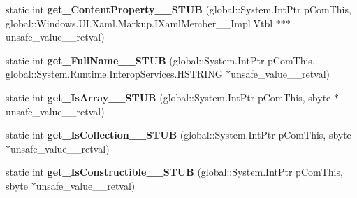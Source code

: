 \begin{DoxyCompactItemize}
\item 
\mbox{\label{struct_windows_1_1_u_i_1_1_xaml_1_1_markup_1_1_i_xaml_type_____impl_1_1_vtbl_ada750449c85f0ee2addc461396c3694e}} 
static int {\bfseries get\+\_\+\+Content\+Property\+\_\+\+\_\+\+S\+T\+UB} (global\+::\+System.\+Int\+Ptr p\+Com\+This, global\+::\+Windows.\+U\+I.\+Xaml.\+Markup.\+I\+Xaml\+Member\+\_\+\+\_\+\+Impl.\+Vtbl $\ast$$\ast$$\ast$unsafe\+\_\+value\+\_\+\+\_\+retval)
\item 
\mbox{\label{struct_windows_1_1_u_i_1_1_xaml_1_1_markup_1_1_i_xaml_type_____impl_1_1_vtbl_a2968dc9d0e625f5da74b55b8a6c8179e}} 
static int {\bfseries get\+\_\+\+Full\+Name\+\_\+\+\_\+\+S\+T\+UB} (global\+::\+System.\+Int\+Ptr p\+Com\+This, global\+::\+System.\+Runtime.\+Interop\+Services.\+H\+S\+T\+R\+I\+NG $\ast$unsafe\+\_\+value\+\_\+\+\_\+retval)
\item 
\mbox{\label{struct_windows_1_1_u_i_1_1_xaml_1_1_markup_1_1_i_xaml_type_____impl_1_1_vtbl_ab8219cd3b1d3d3c3f585a6b8b8bfc195}} 
static int {\bfseries get\+\_\+\+Is\+Array\+\_\+\+\_\+\+S\+T\+UB} (global\+::\+System.\+Int\+Ptr p\+Com\+This, sbyte $\ast$unsafe\+\_\+value\+\_\+\+\_\+retval)
\item 
\mbox{\label{struct_windows_1_1_u_i_1_1_xaml_1_1_markup_1_1_i_xaml_type_____impl_1_1_vtbl_a1baa441a23c37611c49b850c74fbf051}} 
static int {\bfseries get\+\_\+\+Is\+Collection\+\_\+\+\_\+\+S\+T\+UB} (global\+::\+System.\+Int\+Ptr p\+Com\+This, sbyte $\ast$unsafe\+\_\+value\+\_\+\+\_\+retval)
\item 
\mbox{\label{struct_windows_1_1_u_i_1_1_xaml_1_1_markup_1_1_i_xaml_type_____impl_1_1_vtbl_a42a944d99e96c49c14985643ca16006c}} 
static int {\bfseries get\+\_\+\+Is\+Constructible\+\_\+\+\_\+\+S\+T\+UB} (global\+::\+System.\+Int\+Ptr p\+Com\+This, sbyte $\ast$unsafe\+\_\+value\+\_\+\+\_\+retval)
\item 
\mbox{\label{struct_windows_1_1_u_i_1_1_xaml_1_1_markup_1_1_i_xaml_type_____impl_1_1_vtbl_ae4a7077f691827099102d01d8f220dfa}} 

\end{DoxyCompactItemize}
